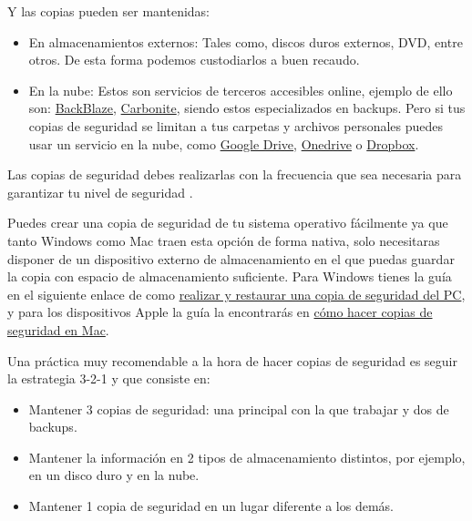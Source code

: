 \documentclass[
  a4paper,
  openany]{book}
\begin{document}
Y las copias pueden ser mantenidas:

\begin{itemize}
\item
  En almacenamientos externos: Tales como, discos duros externos, DVD, entre otros. De esta forma podemos custodiarlos a buen recaudo.
\item
  En la nube: Estos son servicios de terceros accesibles online, ejemplo de ello son: \href{https://www.backblaze.com/home-1.html}{BackBlaze}, \href{https://www.carbonite.com/}{Carbonite}, siendo estos especializados en backups. Pero si tus copias de seguridad se limitan a tus carpetas y archivos personales puedes usar un servicio en la nube, como \href{https://www.google.com/intl/en_in/drive/}{Google Drive}, \href{https://www.microsoft.com/en-us/microsoft-365/onedrive/online-cloud-storage}{Onedrive} o \href{https://www.dropbox.com/}{Dropbox}.
\end{itemize}

Las copias de seguridad debes realizarlas con la frecuencia que sea necesaria para garantizar tu nivel de seguridad \citep{tipos-copia-seguridad}.

Puedes crear una copia de seguridad de tu sistema operativo fácilmente ya que tanto Windows como Mac traen esta opción de forma nativa, solo necesitaras disponer de un dispositivo externo de almacenamiento en el que puedas guardar la copia con espacio de almacenamiento suficiente. Para Windows tienes la guía en el siguiente enlace de como \href{https://support.microsoft.com/es-es/windows/realizar-y-restaurar-una-copia-de-seguridad-del-pc-ac359b36-7015-4694-de9a-c5eac1ce9d9c}{realizar y restaurar una copia de seguridad del PC}, y para los dispositivos Apple la guía la encontrarás en \href{https://support.apple.com/es-es/mac-backup}{cómo hacer copias de seguridad en Mac}.

Una práctica muy recomendable a la hora de hacer copias de seguridad es seguir la estrategia 3-2-1 \citep{INCI-copia-3-2-1} y que consiste en:

\begin{itemize}
\item
  Mantener 3 copias de seguridad: una principal con la que trabajar y dos de backups.
\item
  Mantener la información en 2 tipos de almacenamiento distintos, por ejemplo, en un disco duro y en la nube.
\item
  Mantener 1 copia de seguridad en un lugar diferente a los demás.
\end{itemize}
\end{document}
